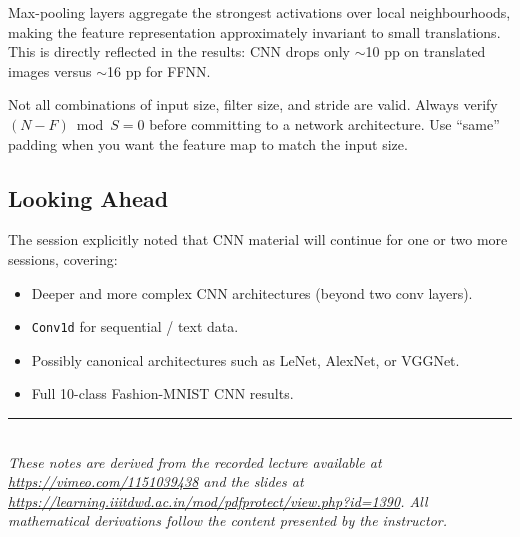 \documentclass[12pt,a4paper]{article}
\begin{document}
\begin{keyinsight}[title=Key Takeaway 2 -- Translation Invariance]
Max-pooling layers aggregate the strongest activations over local
neighbourhoods, making the feature representation approximately invariant to
small translations.  This is directly reflected in the results: CNN drops only
$\sim$10 pp on translated images versus $\sim$16 pp for FFNN.
\end{keyinsight}

\begin{keyinsight}[title=Key Takeaway 3 -- Validity of Configurations]
Not all combinations of input size, filter size, and stride are valid.  Always
verify $(N-F)\bmod S = 0$ before committing to a network architecture.  Use
``same'' padding when you want the feature map to match the input size.
\end{keyinsight}

\subsection{Looking Ahead}
\label{subsec:ahead}

The session explicitly noted that CNN material will continue for one or two
more sessions, covering:

\begin{itemize}[leftmargin=2em]
  \item Deeper and more complex CNN architectures (beyond two conv layers).
  \item \texttt{Conv1d} for sequential / text data.
  \item Possibly canonical architectures such as LeNet, AlexNet, or VGGNet.
  \item Full 10-class Fashion-MNIST CNN results.
\end{itemize}

\vspace{1.5em}
\noindent\rule{\textwidth}{0.5pt}\\[0.3em]
{\small\itshape
These notes are derived from the recorded lecture available at
\url{https://vimeo.com/1151039438} and the slides at
\url{https://learning.iiitdwd.ac.in/mod/pdfprotect/view.php?id=1390}.
All mathematical derivations follow the content presented by the instructor.}
\end{document}
